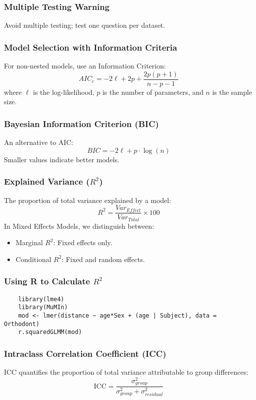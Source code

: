 \documentclass{beamer}
\begin{document}
\begin{frame}
    \frametitle{Multiple Testing Warning}
    Avoid multiple testing; test one question per dataset.
\end{frame}

\begin{frame}
    \frametitle{Model Selection with Information Criteria}
    For non-nested models, use an Information Criterion:
    \[
    AIC_c = -2 \ell + 2 p + \frac{2p(p+1)}{n-p-1}
    \]
    where $\ell$ is the log-likelihood, $p$ is the number of parameters, and $n$ is the sample size.
\end{frame}

\begin{frame}
    \frametitle{Bayesian Information Criterion (BIC)}
    An alternative to AIC:
    \[
    BIC = -2 \ell + p \cdot \log(n)
    \]
    Smaller values indicate better models.
\end{frame}

\begin{frame}
    \frametitle{Explained Variance ($R^2$)}
    The proportion of total variance explained by a model:
    \[
    R^2 = \frac{Var_{Effect}}{Var_{Total}} \times 100
    \]
    In Mixed Effects Models, we distinguish between:
    \begin{itemize}
        \item Marginal $R^2$: Fixed effects only.
        \item Conditional $R^2$: Fixed and random effects.
    \end{itemize}
\end{frame}

\begin{frame}
    \frametitle{Using R to Calculate $R^2$}
    \lstset{style=Rstyle}
    \begin{lstlisting}
    library(lme4)
    library(MuMIn)
    mod <- lmer(distance ~ age*Sex + (age | Subject), data = Orthodont)
    r.squaredGLMM(mod)
    \end{lstlisting}
\end{frame}

\begin{frame}
    \frametitle{Intraclass Correlation Coefficient (ICC)}
    ICC quantifies the proportion of total variance attributable to group differences:
    \[
    \text{ICC} = \frac{\sigma^2_{group}}{\sigma^2_{group} + \sigma^2_{residual}}
    \]
\end{frame}

\end{document}
